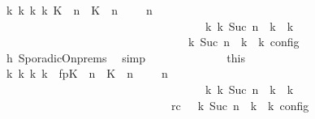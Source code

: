 \begin{isabellebody}
\ {\isacartoucheopen}{\isasymexists}{\isasymGamma}\isactrlsub k\ {\isasymPsi}\isactrlsub k\ {\isasymPhi}\isactrlsub k\ k{\isachardot}\ {\isacharparenleft}{\isacharparenleft}{\isacharparenleft}{\isacharparenleft}K\ {\isasymUp}\ n{\isacharparenright}\ {\isacharhash}\ {\isacharparenleft}K\ {\isasymDown}\ n\ {\isacharat}\ {\isasymtau}{\isacharparenright}\ {\isacharhash}\ {\isasymGamma}{\isacharparenright}{\isacharcomma}\ n\ {\isasymturnstile}\ {\isasymPsi}\ {\isasymtriangleright}\ {\isasymPhi}{\isacharparenright}\isanewline
\ \ \ \ \ \ \ \ \ \ \ \ \ \ \ \ \ \ \ \ \ \ \ \ \ \ \ \ \ \ \ \ \ \ \ \ {\isasymhookrightarrow}\isactrlbsup k\isactrlesup \ {\isacharparenleft}{\isasymGamma}\isactrlsub k{\isacharcomma}\ Suc\ n\ {\isasymturnstile}\ {\isasymPsi}\isactrlsub k\ {\isasymtriangleright}\ {\isasymPhi}\isactrlsub k{\isacharparenright}{\isacharparenright}\isanewline
\ \ \ \ \ \ \ \ \ \ \ \ \ \ \ \ \ \ \ \ \ \ \ \ \ \ \ \ \ {\isasymand}\ {\isasymrho}\ {\isasymin}\ {\isasymlbrakk}\ {\isasymGamma}\isactrlsub k{\isacharcomma}\ Suc\ n\ {\isasymturnstile}\ {\isasymPsi}\isactrlsub k\ {\isasymtriangleright}\ {\isasymPhi}\isactrlsub k\ {\isasymrbrakk}\isactrlsub c\isactrlsub o\isactrlsub n\isactrlsub f\isactrlsub i\isactrlsub g{\isacartoucheclose}\isanewline
\ \ \ \ \ \ \ \ \ \ \ \ \isamarkupfalse%
\ h{}\ SporadicOn{\isachardot}prems\ \isamarkupfalse%
\ simp\isanewline
\isanewline
\ \ \ \ \ \ \ \ \ \ \ \ \isamarkupfalse%
\ this\ \isamarkupfalse%
\ {\isasymGamma}\isactrlsub k\ {\isasymPsi}\isactrlsub k\ {\isasymPhi}\isactrlsub k\ k\ \ fp{\isacharcolon}{\isacartoucheopen}{\isacharparenleft}{\isacharparenleft}{\isacharparenleft}{\isacharparenleft}K\ {\isasymUp}\ n{\isacharparenright}\ {\isacharhash}\ {\isacharparenleft}K\ {\isasymDown}\ n\ {\isacharat}\ {\isasymtau}{\isacharparenright}\ {\isacharhash}\ {\isasymGamma}{\isacharparenright}{\isacharcomma}\ n\ {\isasymturnstile}\ {\isasymPsi}\ {\isasymtriangleright}\ {\isasymPhi}{\isacharparenright}\isanewline
\ \ \ \ \ \ \ \ \ \ \ \ \ \ \ \ \ \ \ \ \ \ \ \ \ \ \ \ \ \ \ \ \ \ \ \ {\isasymhookrightarrow}\isactrlbsup k\isactrlesup \ {\isacharparenleft}{\isasymGamma}\isactrlsub k{\isacharcomma}\ Suc\ n\ {\isasymturnstile}\ {\isasymPsi}\isactrlsub k\ {\isasymtriangleright}\ {\isasymPhi}\isactrlsub k{\isacharparenright}{\isacharparenright}{\isacartoucheclose}\isanewline
\ \ \ \ \ \ \ \ \ \ \ \ \ \ \ \ \ \ \ \ \ \ \ \ \ \ \ \ \ \ rc{\isacharcolon}{\isacartoucheopen}{\isasymrho}\ {\isasymin}\ {\isasymlbrakk}\ {\isasymGamma}\isactrlsub k{\isacharcomma}\ Suc\ n\ {\isasymturnstile}\ {\isasymPsi}\isactrlsub k\ {\isasymtriangleright}\ {\isasymPhi}\isactrlsub k\ {\isasymrbrakk}\isactrlsub c\isactrlsub o\isactrlsub n\isactrlsub f\isactrlsub i\isactrlsub g{\isacartoucheclose}\ \isamarkupfalse%

\end{isabellebody}
